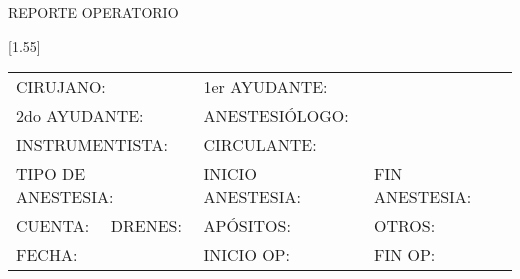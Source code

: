\documentclass[10pt,a4paper]{article}
\begin{document}
 
\vspace*{2cm}
\hspace{11cm}
\begin{LARGE}
REPORTE OPERATORIO
\end{LARGE}
\vspace{1cm}

\scalebox{1.4}[1.55]{
\begin{tabular}{p{2.8cm}p{2.8cm}p{2.8cm}p{2.8cm}}
\multicolumn{2}{l}{\begin{minipage}[t]{5.5 cm}\scriptsize{CIRUJANO: }\end{minipage}}&\multicolumn{2}{l}{\begin{minipage}[t]{5.5 cm}\scriptsize{1er AYUDANTE: }\end{minipage}}\\
\multicolumn{2}{l}{\begin{minipage}[t]{5.5 cm}\scriptsize{2do AYUDANTE: }\end{minipage}}&\multicolumn{2}{l}{\begin{minipage}[t]{5.5 cm}\scriptsize{ANESTESI\'OLOGO: }\end{minipage}}\\
\multicolumn{2}{l}{\begin{minipage}[t]{5.5 cm}\scriptsize{INSTRUMENTISTA: }\end{minipage}}&\multicolumn{2}{l}{\begin{minipage}[t]{5.5 cm}\scriptsize{CIRCULANTE: }\end{minipage}}\\
\multicolumn{2}{l}{\begin{minipage}[t]{5.5 cm}\scriptsize{TIPO DE ANESTESIA: }\end{minipage}} & \scriptsize{INICIO ANESTESIA: } & \scriptsize{FIN ANESTESIA: }\\
\scriptsize{CUENTA:} & \scriptsize{DRENES: } & \scriptsize{AP\'OSITOS: } &  \scriptsize{OTROS: } \\
\multicolumn{2}{l}{\begin{minipage}[t]{5.5 cm}\scriptsize{FECHA: }\end{minipage}} & \scriptsize{INICIO OP: } & \scriptsize{FIN OP: } \\
\end{tabular}}
\end{document}
